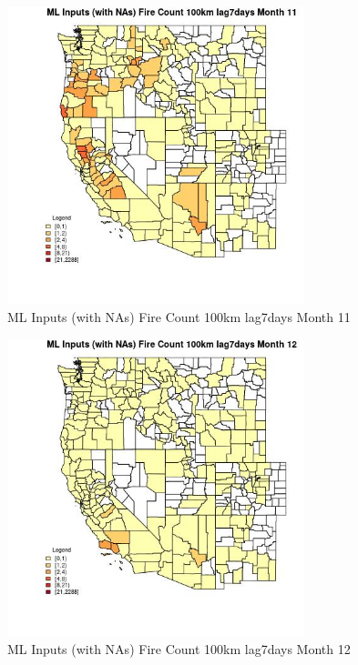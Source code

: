 \clearpage 

\begin{figure} 
\centering  
\includegraphics[width=0.77\textwidth]{Code_Outputs/Report_ML_input_PM25_Step4_part_e_de_duplicated_aves_compiled_2019-05-21wNAs_CountyFire_Count_100km_lag7daysmedianMonth11.jpg} 
\caption{\label{fig:Report_ML_input_PM25_Step4_part_e_de_duplicated_aves_compiled_2019-05-21wNAsCountyFire_Count_100km_lag7daysmedianMonth11}ML Inputs (with NAs) Fire Count 100km lag7days Month 11} 
\end{figure} 
 

\begin{figure} 
\centering  
\includegraphics[width=0.77\textwidth]{Code_Outputs/Report_ML_input_PM25_Step4_part_e_de_duplicated_aves_compiled_2019-05-21wNAs_CountyFire_Count_100km_lag7daysmedianMonth12.jpg} 
\caption{\label{fig:Report_ML_input_PM25_Step4_part_e_de_duplicated_aves_compiled_2019-05-21wNAsCountyFire_Count_100km_lag7daysmedianMonth12}ML Inputs (with NAs) Fire Count 100km lag7days Month 12} 
\end{figure} 
 

